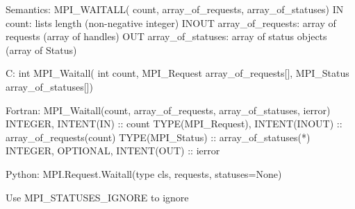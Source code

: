 Semantics:
MPI_WAITALL( count, array_of_requests, array_of_statuses)
IN count: lists length (non-negative integer)
INOUT array_of_requests: array of requests (array of handles)
OUT array_of_statuses: array of status objects (array of Status)

C:
int MPI_Waitall(
    int count, MPI_Request array_of_requests[],
    MPI_Status array_of_statuses[])

Fortran:
MPI_Waitall(count, array_of_requests, array_of_statuses, ierror)
INTEGER, INTENT(IN) :: count
TYPE(MPI_Request), INTENT(INOUT) :: array_of_requests(count)
TYPE(MPI_Status) :: array_of_statuses(*)
INTEGER, OPTIONAL, INTENT(OUT) :: ierror

Python:
MPI.Request.Waitall(type cls, requests, statuses=None)

Use MPI_STATUSES_IGNORE to ignore
